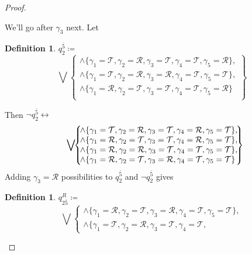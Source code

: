 \documentclass[twoside,twocolumn,a4paper,11pt]{article}
\theoremstyle{definition}
\newtheorem{defn}[theorem]{Definition}
\begin{document}
\begin{proof}
\begin{description}[itemsep=2pt,topsep=3pt,leftmargin=0.6em]
We'll go after $\gamma_3$ next. Let
\begin{defn}%
\label{def:q2bar5}
$q_{2}^{\bar{5}} \coloneqq$
\begin{equation}
\label{eq:q2bar5}
\bigvee\!\!
 \left\lbrace\!
  \begin{matrix}
   \land\{\gamma_1=\mathcal{T},\gamma_2=\mathcal{R},\gamma_3=\mathcal{T},\gamma_4=\mathcal{T},
   \gamma_5=\mathcal{R}\},\\
   \land\{\gamma_1=\mathcal{T},\gamma_2=\mathcal{R},\gamma_3=\mathcal{R},\gamma_4=\mathcal{T},
   \gamma_5=\mathcal{T}\},\\
   \land\{\gamma_1=\mathcal{R},\gamma_2=\mathcal{T},\gamma_3=\mathcal{T},\gamma_4=\mathcal{T},
   \gamma_5=\mathcal{R}\}\;\\
  \end{matrix}\!
 \right\rbrace\!\!\!\!
\end{equation}
\end{defn}
Then $\neg q_{2}^{\bar{5}} \leftrightarrow$
\begin{equation}
\label{eq:notq2bar5}
\bigvee\!\!
 \left\lbrace\!
  \begin{matrix}
   \land\{\gamma_1=\mathcal{T},\gamma_2=\mathcal{R},\gamma_3=\mathcal{T},\gamma_4=\mathcal{R},
   \gamma_5=\mathcal{T}\},\vspace{0pt}\\
   \land\{\gamma_1=\mathcal{R},\gamma_2=\mathcal{T},\gamma_3=\mathcal{T},\gamma_4=\mathcal{R},
   \gamma_5=\mathcal{T}\},\\
   \land\{\gamma_1=\mathcal{R},\gamma_2=\mathcal{R},\gamma_3=\mathcal{T},\gamma_4=\mathcal{T},
   \gamma_5=\mathcal{T}\},\\
   \land\{\gamma_1=\mathcal{R},\gamma_2=\mathcal{T},\gamma_3=\mathcal{R},\gamma_4=\mathcal{T},
   \gamma_5=\mathcal{T}\}\;\\
  \end{matrix}\!
 \right\rbrace\!\!\!\!\!
\end{equation}
Adding $\gamma_3=\mathcal{R}$ possibilities to $q_2^{\bar{5}}$ and 
$\neg q_2^{\bar{5}}$ gives
\begin{defn}
\label{def:q2bar5R}
$q_{2{\bar{5}}}^R \coloneqq$
\begin{equation}
\label{eq:q2bar5R}
\bigvee\!\!
 \left\lbrace\!
  \begin{matrix}
   \land\{\gamma_1=\mathcal{R},\gamma_2=\mathcal{T},\gamma_3=\mathcal{R},\gamma_4=\mathcal{T},
   \gamma_5=\mathcal{T}\},\\
   \land\{\gamma_1=\mathcal{T},\gamma_2=\mathcal{R},\gamma_3=\mathcal{T},\gamma_4=\mathcal{T},

\end{matrix}
\end{equation}
\end{defn}
\end{description}
\end{proof}
\end{document}
